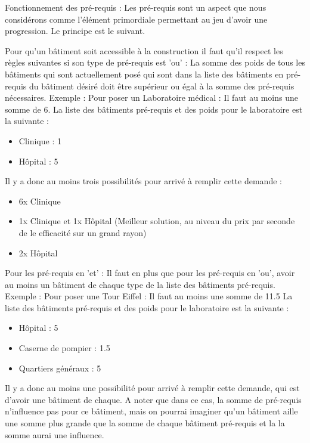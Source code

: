 \documentclass[a4paper,10pt,openany,oneside]{report}
\begin{document}
Fonctionnement des pré-requis :
Les pré-requis sont un aspect que nous considérons comme l'élément primordiale permettant au jeu d'avoir une progression. Le principe est le suivant.

Pour qu'un bâtiment soit accessible à la construction il faut qu'il respect les règles suivantes si son type de pré-requis est 'ou' :
La somme des poids de tous les bâtiments qui sont actuellement posé qui sont dans la liste des bâtiments en pré-requis du bâtiment désiré doit être supérieur ou égal à la somme des pré-requis nécessaires.
Exemple :
Pour poser un Laboratoire médical : Il faut au moins une somme de 6.
La liste des bâtiments pré-requis et des poids pour le laboratoire est la suivante :
\begin{itemize}
	\item Clinique : 1
	\item Hôpital : 5
\end{itemize}
Il y a donc au moins trois possibilités pour arrivé à remplir cette demande :
\begin{itemize}
	\item 6x Clinique
	\item 1x Clinique et 1x Hôpital (Meilleur solution, au niveau du prix par seconde de le efficacité sur un grand rayon)
	\item 2x Hôpital
\end{itemize}

Pour les pré-requis en 'et' :
Il faut en plus que pour les pré-requis en 'ou', avoir au moins un bâtiment de chaque type de la liste des bâtiments pré-requis.
Exemple :
Pour poser une Tour Eiffel : Il faut au moins une somme de 11.5
La liste des bâtiments pré-requis et des poids pour le laboratoire est la suivante :
\begin{itemize}
	\item Hôpital : 5
	\item Caserne de pompier : 1.5
	\item Quartiers généraux : 5
\end{itemize}
Il y a donc au moins une possibilité pour arrivé à remplir cette demande, qui est d'avoir une bâtiment de chaque. A noter que dans ce cas, la somme de pré-requis n'influence pas pour ce bâtiment, mais on pourrai imaginer qu'un bâtiment aille une somme plus grande que la somme de chaque bâtiment pré-requis et la la somme aurai une influence.
\end{document}
